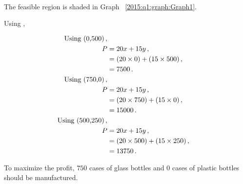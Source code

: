 \begin{subquestions}
\begin{subsubquestions}
\begin{subsubsubquestions}
\subsubsubquestion

The feasible region is shaded in Graph ~\ref{2015:q1:graph:Graph1}.

\end{subsubsubquestions}


\subsubquestion

\begin{subsubsubquestions}
	

\subsubsubquestion

Using ,

\begin{align}
	\text{Using (0,500)}\,, \nonumber \\
	P & = 20x + 15y\,, \nonumber \\
	  & = (20 \times 0) + (15 \times 500)\,, \nonumber \\
	  & = 7500\,. \\
	\text{Using (750,0)}\,, \nonumber \\
	P & = 20x + 15y\,, \nonumber \\
	  & = (20 \times 750) + (15 \times 0)\,, \nonumber \\
	  & = 15000\,. \label{2015:q1:eqn:Profit} \\	  
	\text{Using (500,250)}\,, \nonumber \\
	P & = 20x + 15y\,, \nonumber \\
	  & = (20 \times 500) + (15 \times250)\,, \nonumber \\
	  & = 13750\,.
\end{align}

To maximize the profit, $750$ cases of glass bottles and $0$ cases of plastic bottles should be manufactured.


\subsubsubquestion


\end{subsubsubquestions}
\end{subsubquestions}
\end{subquestions}
